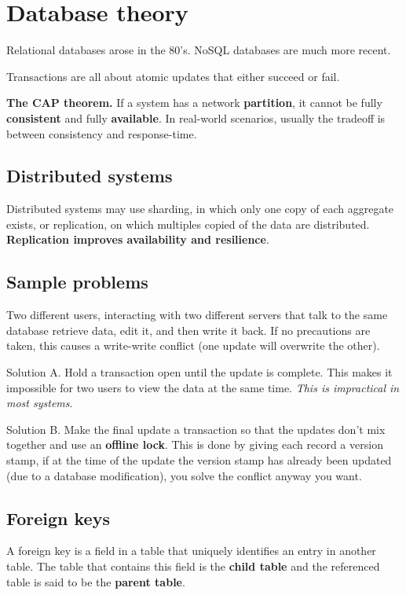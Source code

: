 \documentclass[12pt, oneside]{book}
\begin{document}
\chapter{Database theory}

Relational databases arose in the 80's. NoSQL databases are much more recent.

Transactions are all about atomic updates that either succeed or fail.

\textbf{The CAP theorem.} If a system has a network \textbf{partition}, it
cannot be fully \textbf{consistent} and fully \textbf{available}. In real-world
scenarios, usually the tradeoff is between consistency and response-time.

\section{Distributed systems}
Distributed systems may use sharding, in which only one copy of each aggregate
exists, or replication, on which multiples copied of the data are distributed.
\textbf{Replication improves availability and resilience}.

\section{Sample problems}
Two different users, interacting with two different servers that talk to the
same database retrieve data, edit it, and then write it back. If no precautions
are taken, this causes a write-write conflict (one update will overwrite the
other).

Solution A. Hold a transaction open until the update is complete. This makes it
impossible for two users to view the data at the same time. \textit{This is
impractical in most systems}.

Solution B. Make the final update a transaction so that the updates don't mix
together and use an \textbf{offline lock}. This is done by giving each record a
version stamp, if at the time of the update the version stamp has already been
updated (due to a database modification), you solve the conflict anyway you
want.

\section{Foreign keys}
A foreign key is a field in a table that uniquely identifies an entry in another
table. The table that contains this field is the \textbf{child table} and the
referenced table is said to be the \textbf{parent table}.
\end{document}
